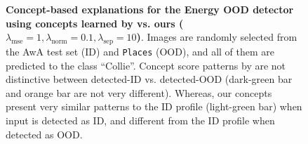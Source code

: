 \begin{figure}[hbt]
\caption{\small \textbf{Concept-based explanations for the Energy OOD detector using concepts learned by \citet{yeh2020completeness} vs. ours ($\lambda_\textrm{mse} = 1, \lambda_\textrm{norm} = 0.1, \lambda_\textrm{sep} = 10$)}. Images are randomly selected from the AwA test set (ID) and \texttt{Places} (OOD), and all of them are predicted to the class ``Collie''. Concept score patterns by \citet{yeh2020completeness} are not distinctive between detected-ID vs. detected-OOD (\ie dark-green bar and orange bar are not very different). Whereas, our concepts present very similar patterns to the ID profile (light-green bar) when input is detected as ID, and different from the ID profile when detected as OOD.
}
\label{fig:expl-energy-collie}

\end{figure}





